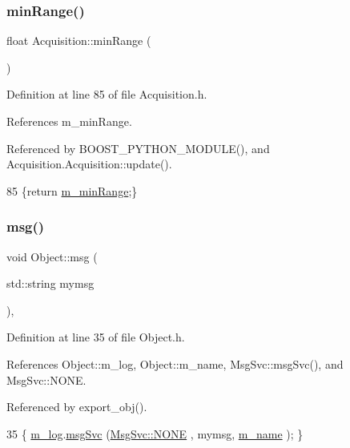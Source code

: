 \subsubsection{\texorpdfstring{min\+Range()}{minRange()}}
{\footnotesize\ttfamily float Acquisition\+::min\+Range (\begin{DoxyParamCaption}{ }\end{DoxyParamCaption})\hspace{0.3cm}{\ttfamily [inline]}}



Definition at line 85 of file Acquisition.\+h.



References m\+\_\+min\+Range.



Referenced by B\+O\+O\+S\+T\+\_\+\+P\+Y\+T\+H\+O\+N\+\_\+\+M\+O\+D\+U\+L\+E(), and Acquisition.\+Acquisition\+::update().


\begin{DoxyCode}
85 \{\textcolor{keywordflow}{return} \hyperlink{classAcquisition_a06b3ea027ebdcb15f64a6517ceb99b76}{m\_minRange};\}
\end{DoxyCode}
\mbox{\label{classObject_a58b2d0618c2d08cf2383012611528d97}} 
\subsubsection{\texorpdfstring{msg()}{msg()}\hspace{0.1cm}{\footnotesize\ttfamily [1/2]}}
{\footnotesize\ttfamily void Object\+::msg (\begin{DoxyParamCaption}\item[{std\+::string}]{mymsg }\end{DoxyParamCaption})\hspace{0.3cm}{\ttfamily [inline]}, {\ttfamily [inherited]}}



Definition at line 35 of file Object.\+h.



References Object\+::m\+\_\+log, Object\+::m\+\_\+name, Msg\+Svc\+::msg\+Svc(), and Msg\+Svc\+::\+N\+O\+NE.



Referenced by export\+\_\+obj().


\begin{DoxyCode}
35 \{ \hyperlink{classObject_a0d269813dd7ac1f24bc143031e2963f2}{m\_log}.\hyperlink{classMsgSvc_ad25f18047920cc59a314e5098259711c}{msgSvc} (\hyperlink{classMsgSvc_ae671eb7301996cd049d2da8a65925926a9be9ae32fed8e1e6eba4a58692210fbd}{MsgSvc::NONE}    , mymsg, \hyperlink{classObject_a8b83c95c705d2c3ba0d081fe1710f48d}{m\_name} ); \}
\end{DoxyCode}
\mbox{\label{classObject_ac5d59299273cee27aacf7de00d2e7034}} 

